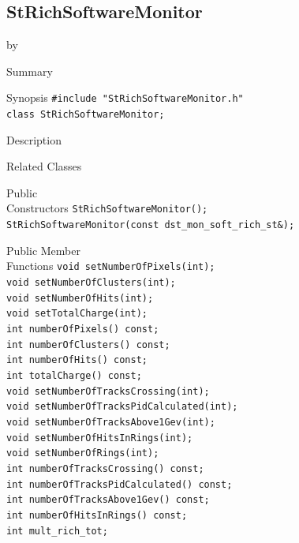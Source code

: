 \documentclass[twoside]{article}
\newcommand{\entrylabel}[1]{\mbox{\textbf{{#1}}}\hfil}%
\newenvironment{entry}
{\begin{list}{}%
    {\renewcommand{\makelabel}{\entrylabel}%
     \setlength{\labelwidth}{90pt}%
     \setlength{\leftmargin}{\labelwidth}
     \advance\leftmargin by \labelsep%
      }%
    }%
  {\end{list}}
\newcommand{\Entrylabel}[1]%
{\raisebox{0pt}[1ex][0pt]{\makebox[\labelwidth][l]%
    {\parbox[t]{\labelwidth}{\hspace{0pt}\textbf{{#1}}}}}}
\newenvironment{Entry}%
{\renewcommand{\entrylabel}{\Entrylabel}\begin{entry}}%
  {\end{entry}}
\begin{document}
\subsection{StRichSoftwareMonitor}
\label{sec:StRichSoftwareMonitor}
\begin{Entry}
\item[Summary]
\item[Synopsis]
    \verb+#include "StRichSoftwareMonitor.h"+\\
    \verb+class StRichSoftwareMonitor;+\\
\item[Description]
\item[Related Classes]
\item[Public\\ Constructors]
    \verb+StRichSoftwareMonitor();+\\
    \verb+StRichSoftwareMonitor(const dst_mon_soft_rich_st&);+\\
\item[Public Member\\ Functions]
    \verb+void setNumberOfPixels(int);+\\
    \verb+void setNumberOfClusters(int);+\\
    \verb+void setNumberOfHits(int);+\\
    \verb+void setTotalCharge(int);+\\
    \verb+int numberOfPixels() const;+\\
    \verb+int numberOfClusters() const;+\\
    \verb+int numberOfHits() const;+\\
    \verb+int totalCharge() const;+\\
    \verb+void setNumberOfTracksCrossing(int);+\\
    \verb+void setNumberOfTracksPidCalculated(int);+\\
    \verb+void setNumberOfTracksAbove1Gev(int);+\\
    \verb+void setNumberOfHitsInRings(int);+\\
    \verb+void setNumberOfRings(int);+\\
    \verb+int numberOfTracksCrossing() const;+\\
    \verb+int numberOfTracksPidCalculated() const;+\\
    \verb+int numberOfTracksAbove1Gev() const;+\\
    \verb+int numberOfHitsInRings() const;+\\
    \verb+int mult_rich_tot;+\\
\end{Entry}
\end{document}
